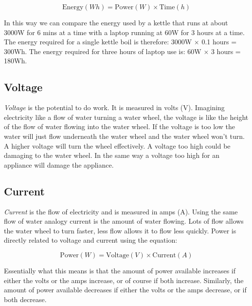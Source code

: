 \documentclass{article}
\theoremstyle{definition}
\theoremstyle{definition}
\theoremstyle{remark}
\begin{document}
    \begin{equation}
      \text{Energy} (Wh) = \text{Power} (W) \times \text{Time} (h)
    \end{equation}

    In this way we can compare the energy used by a kettle that runs at about 3000W for 6 mins at a time with a laptop running at 60W for 3 hours at a time. The energy required for a single kettle boil is therefore: 3000W $\times$ 0.1 hours = 300Wh. The energy required for three hours of laptop use is: 60W $\times$ 3 hours = 180Wh. 
  

  {\color{blue}\subsection{Voltage}} %
  \label{sub:voltage}

    \textit{Voltage} is the potential  to do work. It is measured in volts (V). Imagining electricity like a flow of water turning a water wheel, the voltage is like the height of the flow of water flowing into the water wheel. If the voltage is too low the water will just flow underneath the water wheel and the water wheel won't turn. A higher voltage will turn the wheel effectively. A voltage too high could be damaging to the water wheel. In the same way a voltage too high for an appliance will damage the appliance. 


  {\color{blue}\subsection{Current}} %
  \label{sub:current}

    \textit{Current} is the flow of electricity and is measured in amps (A). Using the same flow of water analogy current is the amount of water flowing. Lots of flow allows the water wheel to turn faster, less flow allows it to flow less quickly. Power is directly related to voltage and current using the equation:

    \begin{equation}
      \text{Power} (W) = \text{Voltage} (V) \times \text{Current} (A)
    \end{equation}
    
    Essentially what this means is that the amount of power available increases if either the volts or the amps increase, or of course if both increase. Similarly, the amount of power available decreases if either the volts or the amps decrease, or if both decrease.
\end{document}
